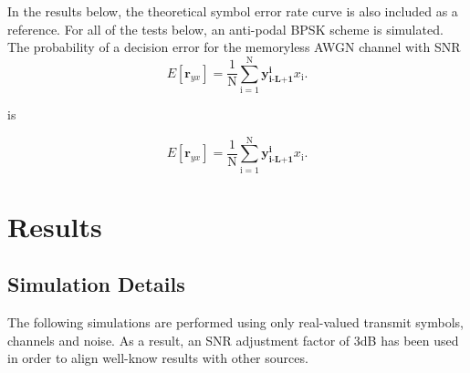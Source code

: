 \documentclass[12pt,a4paper]{report}
\begin{document}
\par
In the results below, the theoretical symbol error rate curve is also included as a reference.
For all of the tests below, an anti-podal BPSK scheme is simulated. The probability of a decision error for the memoryless AWGN channel with SNR 
\begin{equation*}\label{mmse}
E[\mathbf{r}_{yx}]= \frac{1}{\mathrm{N}}\sum_{\mathrm{i=1}}^{\mathrm{N}}
\mathbf{y^{\text{i}}_{\text{i-L+1}}}x_{\text{i}}.
 \end{equation*}

is \cite{proakis1988introduction} 

\begin{equation*}\label{mmse}
E[\mathbf{r}_{yx}]= \frac{1}{\mathrm{N}}\sum_{\mathrm{i=1}}^{\mathrm{N}}
\mathbf{y^{\text{i}}_{\text{i-L+1}}}x_{\text{i}}.
 \end{equation*}



\section{Results}

\subsection{Simulation Details}
The following simulations are performed using only real-valued transmit symbols, channels and noise. As a result, an SNR adjustment factor of 3dB has been used in order to align well-know results with other sources. 
\end{document}
